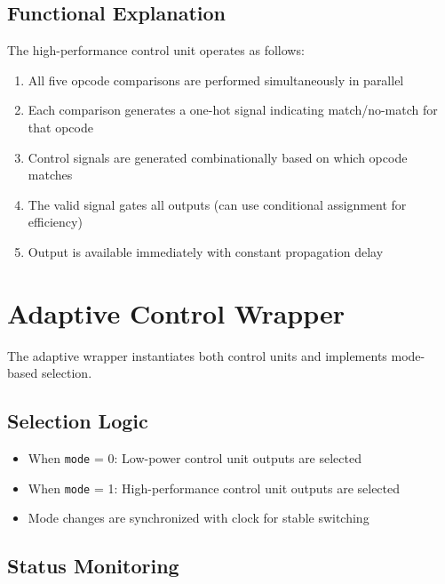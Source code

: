 \documentclass[15pt,a4paper]{report}
\begin{document}
\subsection{Functional Explanation}

The high-performance control unit operates as follows:

\begin{enumerate}
    \item All five opcode comparisons are performed simultaneously in parallel
    
    \item Each comparison generates a one-hot signal indicating match/no-match for that opcode
    
    \item Control signals are generated combinationally based on which opcode matches
    
    \item The valid signal gates all outputs (can use conditional assignment for efficiency)
    
    \item Output is available immediately with constant propagation delay
\end{enumerate}

\section{Adaptive Control Wrapper}

The adaptive wrapper instantiates both control units and implements mode-based selection.

\subsection{Selection Logic}

\begin{itemize}
    \item When \texttt{mode} = 0: Low-power control unit outputs are selected
    \item When \texttt{mode} = 1: High-performance control unit outputs are selected
    \item Mode changes are synchronized with clock for stable switching
\end{itemize}

\subsection{Status Monitoring}
\end{document}

